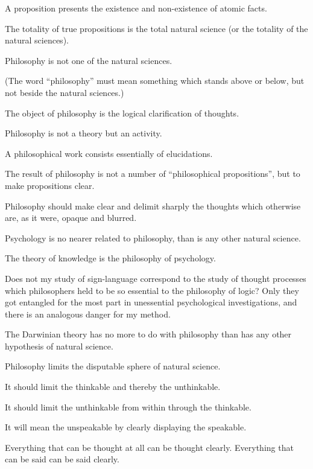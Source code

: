 {A proposition presents the existence and non-existence
of atomic facts.}


{The totality of true propositions is the total
natural science (or the totality of the natural
sciences).}


{Philosophy is not one of the natural
sciences.

(The word ``philosophy'' must mean something
which stands above or below, but not beside the
natural sciences.)}


{The object of philosophy is the logical clarification
of thoughts.

Philosophy is not a theory but an activity.

A philosophical work consists essentially of
elucidations.

The result of philosophy is not a number of
``philosophical propositions'', but to make propositions
clear.

{\verystretchyspace
Philosophy should make clear and delimit
sharply the thoughts which otherwise are, as it
were, opaque and blurred.}}


{Psychology is no nearer related to philosophy,
than is any other natural science.

The theory of knowledge is the philosophy of
psychology.

Does not my study of sign-language correspond
to the study of thought processes which philosophers
held to be so essential to the philosophy of logic?
Only they got entangled for the most part in unessential
psychological investigations, and there
is an analogous danger for my method.}


{The Darwinian theory has no more to do with
philosophy than has any other hypothesis of natural
science.}


{Philosophy limits the disputable sphere of natural
science.}


{It should limit the thinkable and thereby the
unthinkable.

{\stretchyspace
It should limit the unthinkable from within
through the thinkable.}}


{It will mean the unspeakable by clearly displaying
the speakable.}


{Everything that can be thought at all can be
thought clearly. Everything that can be said can
be said clearly.}



